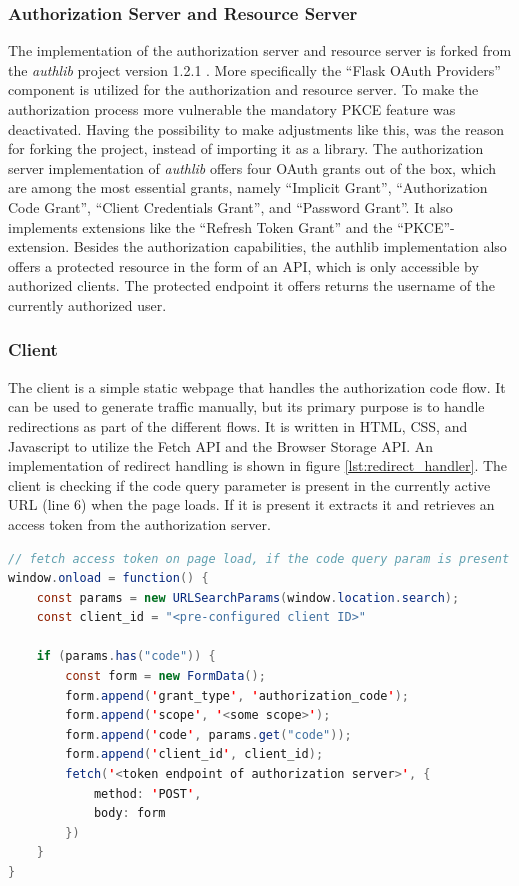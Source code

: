 \documentclass[
    fontsize=12pt,
    headings=small,
    parskip=half,           %
    bibliography=totoc,
    numbers=noenddot,       %
    open=any,               %
    ]{scrreprt}
\begin{document}
\subsubsection{Authorization Server and Resource Server}
The implementation of the authorization server and resource server is forked from the \emph{authlib} project version 1.2.1 \cite{authlib2023}. More specifically the ``Flask OAuth Providers'' component is utilized for the authorization and resource server. To make the authorization process more vulnerable the mandatory PKCE feature was deactivated. Having the possibility to make adjustments like this, was the reason for forking the project, instead of importing it as a library. The authorization server implementation of \emph{authlib} offers four OAuth grants out of the box, which are among the most essential grants, namely ``Implicit Grant'', ``Authorization Code Grant'', ``Client Credentials Grant'', and ``Password Grant''. It also implements extensions like the ``Refresh Token Grant'' and the ``PKCE''-extension. Besides the authorization capabilities, the authlib implementation also offers a protected resource in the form of an API, which is only accessible by authorized clients. The protected endpoint it offers returns the username of the currently authorized user.

\subsubsection{Client}
The client is a simple static webpage that handles the authorization code flow. It can be used to generate traffic manually, but its primary purpose is to handle redirections as part of the different flows. It is written in HTML, CSS, and Javascript to utilize the Fetch API and the Browser Storage API. An implementation of redirect handling is shown in figure \ref{lst:redirect_handler}. The client is checking if the code query parameter is present in the currently active URL (line 6) when the page loads. If it is present it extracts it and retrieves an access token from the authorization server.

\begin{minipage}\linewidth
\begin{lstlisting}[language={java}, caption={Example implementation of authorization code handling at the client}, label={lst:redirect_handler}]
// fetch access token on page load, if the code query param is present
window.onload = function() {
	const params = new URLSearchParams(window.location.search);
	const client_id = "<pre-configured client ID>"

	if (params.has("code")) {
		const form = new FormData();
		form.append('grant_type', 'authorization_code');
		form.append('scope', '<some scope>');
		form.append('code', params.get("code"));
		form.append('client_id', client_id);
		fetch('<token endpoint of authorization server>', {
			method: 'POST',
			body: form
		})
	}
}
\end{lstlisting}
\end{minipage}
\end{document}

